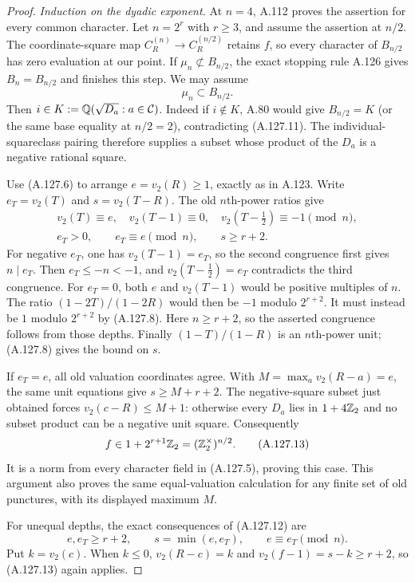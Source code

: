 \begin{proof}
\emph{Induction on the dyadic exponent.}
At $n=4$, A.112 proves the assertion for every
common character.
Let $n=2^r$ with $r\ge3$, and assume the assertion
at $n/2$.
The coordinate-square map
$C_R^{(n)}\to C_R^{(n/2)}$ retains $f$, so every
character of $B_{n/2}$ has zero evaluation at our
point.
If $\mu_n\not\subset B_{n/2}$, the exact stopping
rule A.126 gives $B_n=B_{n/2}$ and finishes this
step.
We may assume
\[
                       \mu_n\subset B_{n/2}.
\tag{A.127.11}
\]
Then $i\in K:=\mathbb Q(\sqrt{D_a}:a\in\mathcal C)$.
Indeed if $i\notin K$, A.80 would give
$B_{n/2}=K$ (or the same base equality at $n/2=2$),
contradicting (A.127.11).
The individual-squareclass pairing therefore
supplies a subset whose product of the $D_a$
is a negative rational square.

Use (A.127.6) to arrange
$e=v_2(R)\ge1$, exactly as in A.123.
Write $e_T=v_2(T)$ and $s=v_2(T-R)$.
The old $n$th-power ratios give
\[
 \begin{gathered}
 v_2(T)\equiv e,\quad v_2(T-1)\equiv0,\quad
                 v_2(T-\tfrac12)\equiv-1\pmod n,\\
 e_T>0,\qquad e_T\equiv e\pmod n,\qquad s\ge r+2.
 \end{gathered}
\tag{A.127.12}
\]
For negative $e_T$, one has $v_2(T-1)=e_T$,
so the second congruence first gives $n\mid e_T$.
Then $e_T\le-n<-1$, and $v_2(T-\tfrac12)=e_T$
contradicts the third congruence.
For $e_T=0$, both $e$ and $v_2(T-1)$ would be
positive multiples of $n$.
The ratio $(1-2T)/(1-2R)$ would then be $-1$
modulo $2^{r+2}$.
It must instead be $1$ modulo $2^{r+2}$ by
(A.127.8).
Here $n\ge r+2$, so the asserted congruence
follows from those depths.
Finally $(1-T)/(1-R)$ is an $n$th-power unit;
(A.127.8) gives the bound on $s$.

If $e_T=e$, all old valuation coordinates agree.
With $M=\max_a v_2(R-a)=e$, the same unit equations
give $s\ge M+r+2$.
The negative-square subset just obtained forces
$v_2(c-R)\le M+1$:
otherwise every $D_a$ lies in $1+4\mathbb Z_2$ and
no subset product can be a negative unit square.
Consequently
\[
                        f\in1+2^{r+1}\mathbb Z_2
                                 =(\mathbb Z_2^\times)^{n/2}.
\tag{A.127.13}
\]
It is a norm from every character field in
(A.127.5), proving this case.
This argument also proves the same equal-valuation
calculation for any finite set of old punctures,
with its displayed maximum $M$.

For unequal depths, the exact consequences of
(A.127.12) are
\[
 e,e_T\ge r+2,\qquad
 s=\min(e,e_T),\qquad e\equiv e_T\pmod n.
\tag{A.127.14}
\]
Put $k=v_2(c)$.
When $k\le0$, $v_2(R-c)=k$ and
$v_2(f-1)=s-k\ge r+2$, so (A.127.13) again applies.


\end{proof}
